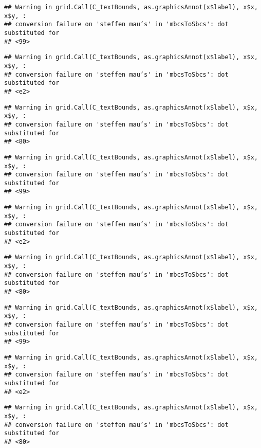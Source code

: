 \documentclass[]{article}
\begin{document}
\begin{verbatim}
## Warning in grid.Call(C_textBounds, as.graphicsAnnot(x$label), x$x, x$y, :
## conversion failure on 'steffen mau’s' in 'mbcsToSbcs': dot substituted for
## <99>
\end{verbatim}

\begin{verbatim}
## Warning in grid.Call(C_textBounds, as.graphicsAnnot(x$label), x$x, x$y, :
## conversion failure on 'steffen mau’s' in 'mbcsToSbcs': dot substituted for
## <e2>
\end{verbatim}

\begin{verbatim}
## Warning in grid.Call(C_textBounds, as.graphicsAnnot(x$label), x$x, x$y, :
## conversion failure on 'steffen mau’s' in 'mbcsToSbcs': dot substituted for
## <80>
\end{verbatim}

\begin{verbatim}
## Warning in grid.Call(C_textBounds, as.graphicsAnnot(x$label), x$x, x$y, :
## conversion failure on 'steffen mau’s' in 'mbcsToSbcs': dot substituted for
## <99>
\end{verbatim}

\begin{verbatim}
## Warning in grid.Call(C_textBounds, as.graphicsAnnot(x$label), x$x, x$y, :
## conversion failure on 'steffen mau’s' in 'mbcsToSbcs': dot substituted for
## <e2>
\end{verbatim}

\begin{verbatim}
## Warning in grid.Call(C_textBounds, as.graphicsAnnot(x$label), x$x, x$y, :
## conversion failure on 'steffen mau’s' in 'mbcsToSbcs': dot substituted for
## <80>
\end{verbatim}

\begin{verbatim}
## Warning in grid.Call(C_textBounds, as.graphicsAnnot(x$label), x$x, x$y, :
## conversion failure on 'steffen mau’s' in 'mbcsToSbcs': dot substituted for
## <99>
\end{verbatim}

\begin{verbatim}
## Warning in grid.Call(C_textBounds, as.graphicsAnnot(x$label), x$x, x$y, :
## conversion failure on 'steffen mau’s' in 'mbcsToSbcs': dot substituted for
## <e2>
\end{verbatim}

\begin{verbatim}
## Warning in grid.Call(C_textBounds, as.graphicsAnnot(x$label), x$x, x$y, :
## conversion failure on 'steffen mau’s' in 'mbcsToSbcs': dot substituted for
## <80>
\end{verbatim}
\end{document}
